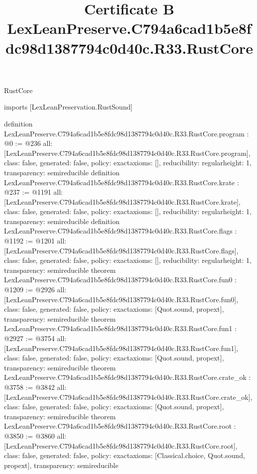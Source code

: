 \begin{lexlean}{RustCore}
\title{Certificate B LexLeanPreserve.C794a6cad1b5e8fdc98d1387794c0d40c.R33.RustCore}
\begin{coremodule}
imports [LexLeanPreservation.RustSound]

definition LexLeanPreserve.C794a6cad1b5e8fdc98d1387794c0d40c.R33.RustCore.program : @0 := @236 {
  all: [LexLeanPreserve.C794a6cad1b5e8fdc98d1387794c0d40c.R33.RustCore.program],
  class: false,
  generated: false,
  policy: exact{axioms: []},
  reducibility: regular{height: 1},
  transparency: semireducible
}
definition LexLeanPreserve.C794a6cad1b5e8fdc98d1387794c0d40c.R33.RustCore.krate : @237 := @1191 {
  all: [LexLeanPreserve.C794a6cad1b5e8fdc98d1387794c0d40c.R33.RustCore.krate],
  class: false,
  generated: false,
  policy: exact{axioms: []},
  reducibility: regular{height: 1},
  transparency: semireducible
}
definition LexLeanPreserve.C794a6cad1b5e8fdc98d1387794c0d40c.R33.RustCore.flags : @1192 := @1201 {
  all: [LexLeanPreserve.C794a6cad1b5e8fdc98d1387794c0d40c.R33.RustCore.flags],
  class: false,
  generated: false,
  policy: exact{axioms: []},
  reducibility: regular{height: 1},
  transparency: semireducible
}
theorem LexLeanPreserve.C794a6cad1b5e8fdc98d1387794c0d40c.R33.RustCore.fun0 : @1209 := @2926 {
  all: [LexLeanPreserve.C794a6cad1b5e8fdc98d1387794c0d40c.R33.RustCore.fun0],
  class: false,
  generated: false,
  policy: exact{axioms: [Quot.sound, propext]},
  transparency: semireducible
}
theorem LexLeanPreserve.C794a6cad1b5e8fdc98d1387794c0d40c.R33.RustCore.fun1 : @2927 := @3754 {
  all: [LexLeanPreserve.C794a6cad1b5e8fdc98d1387794c0d40c.R33.RustCore.fun1],
  class: false,
  generated: false,
  policy: exact{axioms: [Quot.sound, propext]},
  transparency: semireducible
}
theorem LexLeanPreserve.C794a6cad1b5e8fdc98d1387794c0d40c.R33.RustCore.crate_ok : @3758 := @3842 {
  all: [LexLeanPreserve.C794a6cad1b5e8fdc98d1387794c0d40c.R33.RustCore.crate_ok],
  class: false,
  generated: false,
  policy: exact{axioms: [Quot.sound, propext]},
  transparency: semireducible
}
theorem LexLeanPreserve.C794a6cad1b5e8fdc98d1387794c0d40c.R33.RustCore.root : @3850 := @3860 {
  all: [LexLeanPreserve.C794a6cad1b5e8fdc98d1387794c0d40c.R33.RustCore.root],
  class: false,
  generated: false,
  policy: exact{axioms: [Classical.choice, Quot.sound, propext]},
  transparency: semireducible
}


\end{coremodule}
\end{lexlean}
